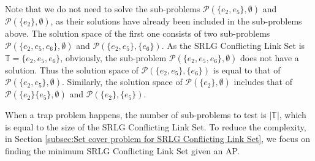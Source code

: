 Note that we do not need to solve the sub-problems ${{\mathcal{P}}(\{ e_2,e_5\}, \emptyset)}$ and ${{\mathcal{P}}(\{ e_2\},\emptyset )}$, as their solutions have already been included in the sub-problems above. The solution space of the first one consists of two sub-problems ${{\mathcal P}(\{ e_2,e_5,e_6\} ,\emptyset )}$ and ${{\mathcal P}(\{ e_2,e_5\} ,\{ e_6\} )}$. As the  SRLG Conflicting Link Set is $\mathbb{T}=\{e_2,e_5,e_6\}$, obviously, the sub-problem ${{\mathcal P}(\{ e_2,e_5,e_6\} ,\emptyset )}$ does not have a solution. Thus the solution space of  ${{\mathcal P}(\{ e_2,e_5\} ,\{ e_6\} )}$ is equal to that of ${{\mathcal{P}}(\{ e_2, e_5\}, \emptyset)}$.  Similarly, the solution space of ${{\mathcal{P}}(\{ e_2\},\emptyset )}$ includes that of ${{\mathcal{P}}(\{ e_2\} \{ e_5\}, \emptyset)}$  and ${{\mathcal{P}}(\{ e_2\} ,\{ e_5\} )}$.



When a trap problem happens, the number of sub-problems to test is $|\mathbb{T}|$, which is equal to the size of the SRLG Conflicting Link Set. To reduce the complexity, in Section \ref{subsec:Set cover problem for SRLG Conflicting Link Set}, we focus on finding the minimum SRLG Conflicting Link Set given an AP.
